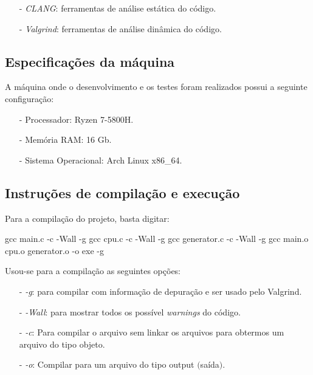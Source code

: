 \documentclass{article}
\begin{document}
\begin{itemize}
    \item[-] \textit{CLANG}: ferramentas de análise estática do código.
    \item[-] \textit{Valgrind}: ferramentas de análise dinâmica do código.
\end{itemize}

\subsection{Especificações da máquina}
A máquina onde o desenvolvimento e os testes foram realizados possui a seguinte configuração:

\begin{itemize}
    \item[-] Processador: Ryzen 7-5800H.
    \item[-] Memória RAM: 16 Gb.
    \item[-] Sistema Operacional: Arch Linux x86\_64.
\end{itemize}


\subsection{Instruções de compilação e execução}

Para a compilação do projeto, basta digitar:

\begin{tcolorbox}[title=Compilando o projeto,width=\linewidth]
    gcc main.c -c -Wall -g \newline
    gcc cpu.c -c -Wall -g \newline
    gcc generator.c -c -Wall -g \newline
    gcc main.o cpu.o generator.o -o exe -g 
\end{tcolorbox}

Usou-se para a compilação as seguintes opções:

\begin{itemize}
    \item [-] \emph{-g}: para compilar com informação de depuração e ser usado pelo Valgrind.
    \item [-] \emph{-Wall}: para mostrar todos os possível \emph{warnings} do código.
    \item [-] \emph{-c}: Para compilar o arquivo sem linkar os arquivos para obtermos um arquivo do tipo objeto.
    \item [-] \emph{-o}: Compilar para um arquivo do tipo output $($saída$)$.
\end{itemize}
\end{document}
